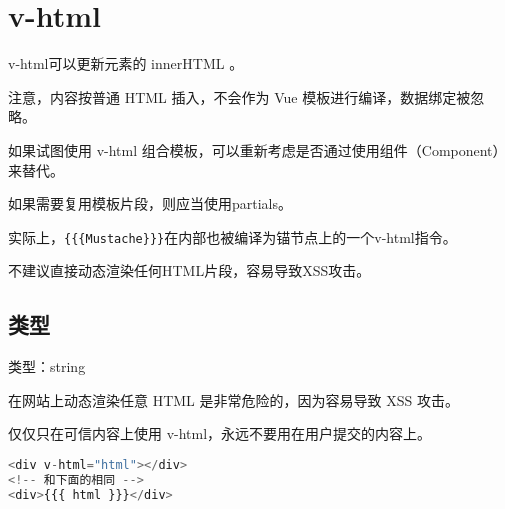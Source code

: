 \chapter{v-html}

v-html可以更新元素的 innerHTML 。

注意，内容按普通 HTML 插入，不会作为 Vue 模板进行编译，数据绑定被忽略。

\begin{compactitem}
\item 如果试图使用 v-html 组合模板，可以重新考虑是否通过使用组件（Component）来替代。
\item 如果需要复用模板片段，则应当使用partials。
\end{compactitem}

实际上，\texttt{\{\{\{Mustache\}\}\}}在内部也被编译为锚节点上的一个v-html指令。

不建议直接动态渲染任何HTML片段，容易导致XSS攻击。

\section{类型}

\begin{compactitem}
\item 类型：string
\end{compactitem}

在网站上动态渲染任意 HTML 是非常危险的，因为容易导致 XSS 攻击。

仅仅只在可信内容上使用 v-html，永远不要用在用户提交的内容上。


\begin{lstlisting}[language=JavaScript]
<div v-html="html"></div>
<!-- 和下面的相同 -->
<div>{{{ html }}}</div>
\end{lstlisting}



\begin{lstlisting}[language=JavaScript]

\end{lstlisting}




\begin{lstlisting}[language=JavaScript]

\end{lstlisting}




\begin{lstlisting}[language=JavaScript]

\end{lstlisting}




